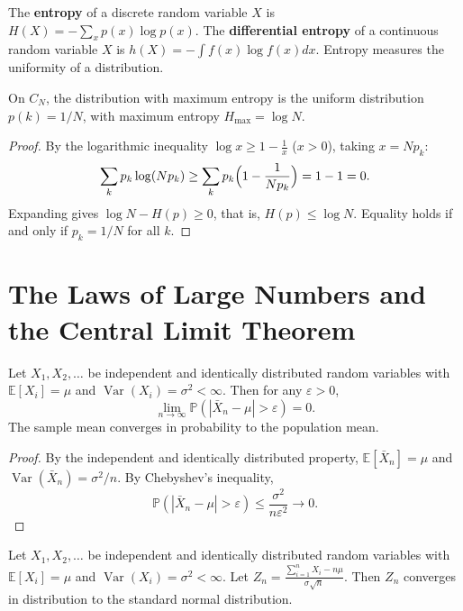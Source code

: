 \begin{definition}[Entropy]\label{def:entropy}
The \textbf{entropy} of a discrete random variable $X$ is $H(X) = -\sum_x p(x) \log p(x)$. The \textbf{differential entropy} of a continuous random variable $X$ is $h(X) = -\int f(x) \log f(x) dx$. Entropy measures the uniformity of a distribution.
\end{definition}

\begin{proposition}\label{prop:uniform_max_entropy}
On $C_N$, the distribution with maximum entropy is the uniform distribution $p(k) = 1/N$, with maximum entropy $H_{\max} = \log N$.
\end{proposition}

\begin{proof}
By the logarithmic inequality $\log x \ge 1 - \frac{1}{x}$ ($x > 0$), taking $x = N p_k$:
\[
\sum_{k} p_k \log(N p_k) \ge \sum_{k} p_k \Bigl( 1 - \frac{1}{N p_k} \Bigr) = 1 - 1 = 0.
\]
Expanding gives $\log N - H(p) \ge 0$, that is, $H(p) \le \log N$. Equality holds if and only if $p_k = 1/N$ for all $k$.
\end{proof}

\section{The Laws of Large Numbers and the Central Limit Theorem}\label{sec:lln_clt}

\begin{theorem}\label{thm:weak_law_of_large_numbers}
Let $X_1, X_2, \dots$ be independent and identically distributed random variables with $\mathbb{E}[X_i] = \mu$ and $\operatorname{Var}(X_i) = \sigma^2 < \infty$. Then for any $\varepsilon > 0$,
\[
\lim_{n \to \infty} \mathbb{P}(|\bar{X}_n - \mu| > \varepsilon) = 0.
\]
The sample mean converges in probability to the population mean.
\end{theorem}

\begin{proof}
By the independent and identically distributed property, $\mathbb{E}[\bar{X}_n] = \mu$ and $\operatorname{Var}(\bar{X}_n) = \sigma^2/n$. By Chebyshev's inequality,
\[
\mathbb{P}(|\bar{X}_n - \mu| > \varepsilon) \le \frac{\sigma^2}{n\varepsilon^2} \to 0.
\]
\end{proof}

\begin{theorem}\label{thm:central_limit_theorem}
Let $X_1, X_2, \dots$ be independent and identically distributed random variables with $\mathbb{E}[X_i] = \mu$ and $\operatorname{Var}(X_i) = \sigma^2 < \infty$. Let $Z_n = \frac{\sum_{i=1}^n X_i - n\mu}{\sigma\sqrt{n}}$. Then $Z_n$ converges in distribution to the standard normal distribution.
\end{theorem}

